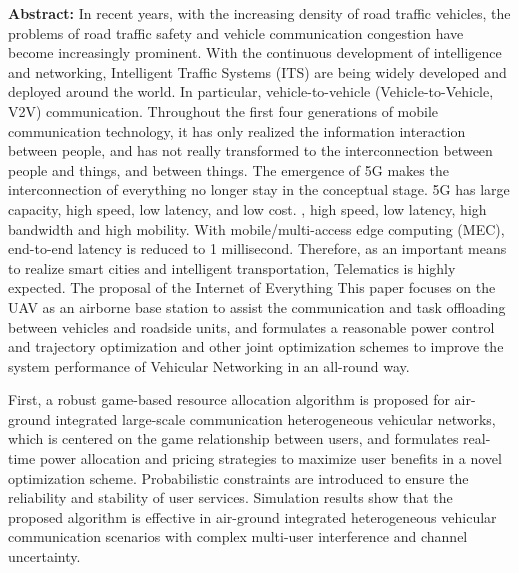 \makeatletter
  \pagestyle{fancy}%
  \fancyhf{}
\makeatother
\vspace{0.39cm}  %
\noindent\textbf{Abstract: }In recent years, with the increasing density of road traffic vehicles, the problems of road traffic safety and vehicle communication congestion have become increasingly prominent.
With the continuous development of intelligence and networking, Intelligent Traffic Systems (ITS) are being widely developed and deployed around the world. In particular,
vehicle-to-vehicle (Vehicle-to-Vehicle, V2V) communication. Throughout the first four generations of mobile communication technology, it has only realized the information interaction
between people, and has not really transformed to the interconnection between people and things, and between things. The emergence of 5G makes the interconnection of everything no
longer stay in the conceptual stage. 5G has large capacity, high speed, low latency, and low cost. , high speed, low latency, high bandwidth and high mobility. With mobile/multi-access edge computing (MEC), end-to-end latency is reduced to 1 millisecond. Therefore, as an important means to realize smart cities and intelligent
transportation, Telematics is highly expected. The proposal of the Internet of Everything This paper focuses on the UAV as an airborne base station to assist the communication and task
offloading between vehicles and roadside units, and formulates a reasonable power control and trajectory optimization and other joint optimization schemes to improve the system
performance of Vehicular Networking in an all-round way.

First, a robust game-based resource allocation algorithm is proposed for air-ground integrated large-scale communication heterogeneous vehicular networks, which is
centered on the game relationship between users, and formulates real-time power allocation and pricing strategies to maximize user benefits in a novel optimization
scheme. Probabilistic constraints are introduced to ensure the reliability and stability of user services. Simulation results show that the proposed algorithm is
effective in air-ground integrated heterogeneous vehicular communication scenarios with complex multi-user interference and channel uncertainty.

